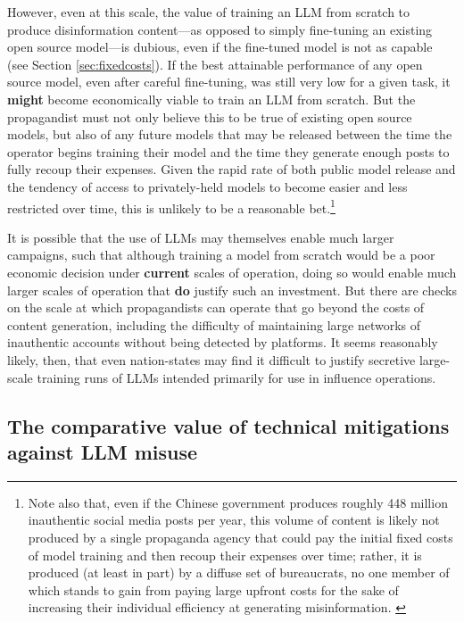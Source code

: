 \documentclass{article}
\begin{document}
However, even at this scale, the value of training an LLM from scratch to produce disinformation content—as opposed to simply fine-tuning an existing open source model—is dubious, even if the fine-tuned model is not as capable (see Section \ref{sec:fixedcosts}). If the best attainable performance of any open source model, even after careful fine-tuning, was still very low for a given task, it \textbf{might} become economically viable to train an LLM from scratch. But the propagandist must not only believe this to be true of existing open source models, but also of any future models that may be released between the time the operator begins training their model and the time they generate enough posts to fully recoup their expenses. Given the rapid rate of both public model release and the tendency of access to privately-held models to become easier and less restricted over time, this is unlikely to be a reasonable bet.\footnote{Note also that, even if the Chinese government produces roughly 448 million inauthentic social media posts per year, this volume of content is likely not produced by a single propaganda agency that could pay the initial fixed costs of model training and then recoup their expenses over time; rather, it is produced (at least in part) by a diffuse set of bureaucrats, no one member of which stands to gain from paying large upfront costs for the sake of increasing their individual efficiency at generating misinformation. \cite{king}} 

It is possible that the use of LLMs may themselves enable much larger campaigns, such that although training a model from scratch would be a poor economic decision under \textbf{current} scales of operation, doing so would enable much larger scales of operation that \textbf{do} justify such an investment. But there are checks on the scale at which propagandists can operate that go beyond the costs of content generation, including the difficulty of maintaining large networks of inauthentic accounts without being detected by platforms. \cite{goldsteinpanel, sedova1} It seems reasonably likely, then, that even nation-states may find it difficult to justify secretive large-scale training runs of LLMs intended primarily for use in influence operations. 

\subsection{The comparative value of technical mitigations against LLM misuse}
\end{document}
